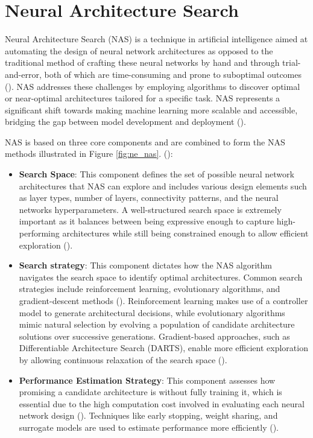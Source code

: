 \section{Neural Architecture Search}\label{sec:ne_nas}
Neural Architecture Search (NAS) is a technique in artificial intelligence aimed at automating the design of neural network architectures as opposed to the traditional method of crafting these neural networks by hand and through trial-and-error, both of which are time-consuming and prone to suboptimal outcomes (\cite{ren2021comprehensive}). NAS addresses these challenges by employing algorithms to discover optimal or near-optimal architectures tailored for a specific task. NAS represents a significant shift towards making machine learning more scalable and accessible, bridging the gap between model development and deployment (\cite{elsken2019neural}).

\parbreak\noindent NAS is based on three core components and are combined to form the NAS methods illustrated in Figure \ref{fig:ne_nas}. (\cite{elsken2019neural}):

\begin{itemize}
    \item \textbf{Search Space}: This component defines the set of possible neural network architectures that NAS can explore and includes various design elements such as layer types, number of layers, connectivity patterns, and the neural networks hyperparameters. A well-structured search space is extremely important as it balances between being expressive enough to capture high-performing architectures while still being constrained enough to allow efficient exploration (\cite{elsken2019neural}).
    \item \textbf{Search strategy}: This component dictates how the NAS algorithm navigates the search space to identify optimal architectures. Common search strategies include reinforcement learning, evolutionary algorithms, and gradient-descent methods (\cite{liu2021survey}). Reinforcement learning makes use of a controller model to generate architectural decisions, while evolutionary algorithms mimic natural selection by evolving a population of candidate architecture solutions over successive generations. Gradient-based approaches, such as Differentiable Architecture Search (DARTS), enable more efficient exploration by allowing continuous relaxation of the search space (\cite{liu2021survey}).
    \item \textbf{Performance Estimation Strategy}: This component assesses how promising a candidate architecture is without fully training it, which is essential due to the high computation cost involved in evaluating each neural network design (\cite{elsken2019neural}). Techniques like early stopping, weight sharing, and surrogate models are used to estimate performance more efficiently (\cite{elsken2019neural}).
\end{itemize}

